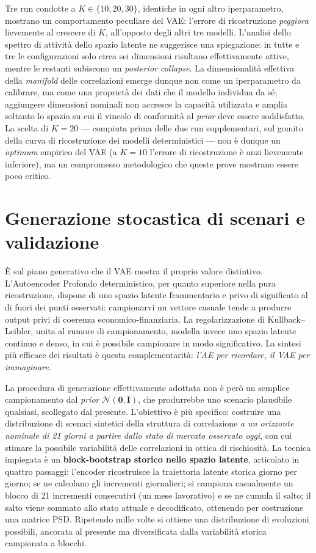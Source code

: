 \documentclass[11pt,a4paper]{article}
\begin{document}
Tre run condotte a $K \in \{10, 20, 30\}$, identiche in ogni altro
iperparametro, mostrano un comportamento peculiare del VAE: l'errore di
ricostruzione \emph{peggiora} lievemente al crescere di $K$, all'opposto degli
altri tre modelli. L'analisi dello spettro di attività dello spazio latente ne
suggerisce una spiegazione: in tutte e tre le configurazioni solo circa sei dimensioni
risultano effettivamente attive, mentre le restanti subiscono un
\emph{posterior collapse}. La dimensionalità effettiva della \emph{manifold}
delle correlazioni emerge dunque non come un iperparametro da calibrare, ma come una
proprietà dei dati che il modello individua da sé; aggiungere dimensioni
nominali non accresce la capacità utilizzata e amplia soltanto lo spazio su
cui il vincolo di conformità al \emph{prior} deve essere soddisfatto. La
scelta di $K = 20$ --- compiuta prima delle due run supplementari, sul gomito
della curva di ricostruzione dei modelli deterministici --- non è dunque un
\emph{optimum} empirico del VAE (a $K = 10$ l'errore di ricostruzione è anzi
lievemente inferiore), ma un compromesso metodologico che queste prove
mostrano essere poco critico.

\section{Generazione stocastica di scenari e validazione}

È sul piano generativo che il VAE mostra il proprio valore distintivo.
L'Autoencoder Profondo deterministico, per quanto superiore nella pura
ricostruzione, dispone di uno spazio latente frammentario e privo di
significato al di fuori dei punti osservati: campionarvi un vettore casuale
tende a produrre output privi di coerenza economico-finanziaria. La regolarizzazione
di Kullback--Leibler, unita al rumore di campionamento, modella invece uno
spazio latente continuo e denso, in cui è possibile campionare in modo
significativo. La sintesi più efficace dei risultati è questa complementarità:
\emph{l'AE per ricordare, il VAE per immaginare}.

La procedura di generazione effettivamente adottata non è però un semplice
campionamento dal \emph{prior} $\mathcal{N}(\mathbf{0},\mathbf{I})$, che
produrrebbe uno scenario plausibile qualsiasi, scollegato dal presente.
L'obiettivo è più specifico: costruire una distribuzione di scenari sintetici
della struttura di correlazione \emph{a un orizzonte nominale di 21 giorni a
partire dallo stato di mercato osservato oggi}, con cui stimare la possibile
variabilità delle correlazioni in ottica di rischiosità.
La tecnica impiegata è un \textbf{block-bootstrap storico nello spazio
latente}, articolato in quattro passaggi: l'encoder ricostruisce la traiettoria
latente storica giorno per giorno; se ne calcolano gli incrementi giornalieri;
si campiona casualmente un blocco di 21 incrementi consecutivi (un mese
lavorativo) e se ne cumula il salto; il salto viene sommato allo stato attuale
e decodificato, ottenendo per costruzione una matrice PSD. Ripetendo mille
volte si ottiene una distribuzione di evoluzioni possibili, ancorata al
presente ma diversificata dalla variabilità storica campionata a blocchi.
\end{document}
